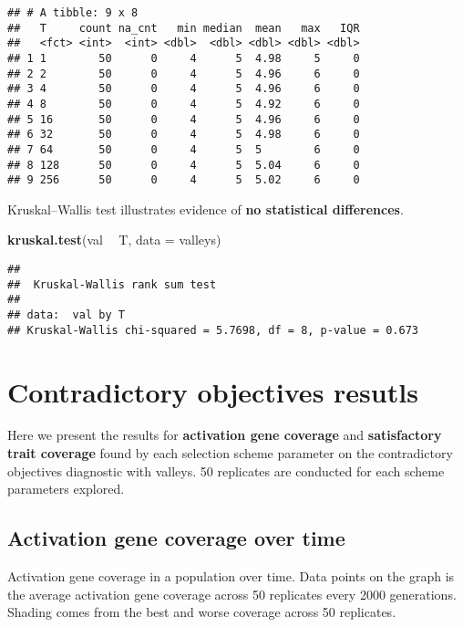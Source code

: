 \documentclass[]{book}
\newenvironment{Shaded}{\begin{snugshade}}{\end{snugshade}}
\newcommand{\DataTypeTok}[1]{\textcolor[rgb]{0.13,0.29,0.53}{#1}}
\newcommand{\KeywordTok}[1]{\textcolor[rgb]{0.13,0.29,0.53}{\textbf{#1}}}
\newcommand{\NormalTok}[1]{#1}
\newcommand{\OperatorTok}[1]{\textcolor[rgb]{0.81,0.36,0.00}{\textbf{#1}}}
\newcommand{\StringTok}[1]{\textcolor[rgb]{0.31,0.60,0.02}{#1}}
\begin{document}
\begin{verbatim}
## # A tibble: 9 x 8
##   T     count na_cnt   min median  mean   max   IQR
##   <fct> <int>  <int> <dbl>  <dbl> <dbl> <dbl> <dbl>
## 1 1        50      0     4      5  4.98     5     0
## 2 2        50      0     4      5  4.96     6     0
## 3 4        50      0     4      5  4.96     6     0
## 4 8        50      0     4      5  4.92     6     0
## 5 16       50      0     4      5  4.96     6     0
## 6 32       50      0     4      5  4.98     6     0
## 7 64       50      0     4      5  5        6     0
## 8 128      50      0     4      5  5.04     6     0
## 9 256      50      0     4      5  5.02     6     0
\end{verbatim}

Kruskal--Wallis test illustrates evidence of \textbf{no statistical differences}.

\begin{Shaded}
\begin{Highlighting}[]
\KeywordTok{kruskal.test}\NormalTok{(val }\OperatorTok{~}\StringTok{ }\NormalTok{T, }\DataTypeTok{data =}\NormalTok{ valleys)}
\end{Highlighting}
\end{Shaded}

\begin{verbatim}
## 
##  Kruskal-Wallis rank sum test
## 
## data:  val by T
## Kruskal-Wallis chi-squared = 5.7698, df = 8, p-value = 0.673
\end{verbatim}

\hypertarget{contradictory-objectives-resutls}{%
\section{Contradictory objectives resutls}\label{contradictory-objectives-resutls}}

Here we present the results for \textbf{activation gene coverage} and \textbf{satisfactory trait coverage} found by each selection scheme parameter on the contradictory objectives diagnostic with valleys.
50 replicates are conducted for each scheme parameters explored.

\hypertarget{activation-gene-coverage-over-time}{%
\subsection{Activation gene coverage over time}\label{activation-gene-coverage-over-time}}

Activation gene coverage in a population over time.
Data points on the graph is the average activation gene coverage across 50 replicates every 2000 generations.
Shading comes from the best and worse coverage across 50 replicates.
\end{document}
